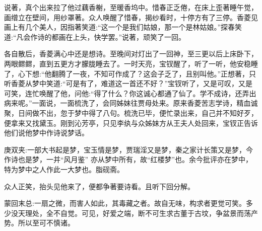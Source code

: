 \begin{parag}
    说著，真个出来拉了他过藕香榭，至暖香坞中。惜春正乏倦，在床上歪著睡午觉，画缯立在壁间，用纱罩著。众人唤醒了惜春，揭纱看时，十停方有了三停。香菱见画上有几个美人，因指著笑道:“这一个是我们姑娘，那一个是林姑娘。”探春笑道:“凡会作诗的都画在上头，快学罢。”说著，顽笑了一回。
\end{parag}


\begin{parag}
    各自散后，香菱满心中还是想诗。至晚间对灯出了一回神，至三更以后上床卧下，两眼鳏鳏，直到五更方才朦胧睡去了。一时天亮，宝钗醒了，听了一听，他安稳睡了，心下想:“他翻腾了一夜，不知可作成了？这会子乏了，且别叫他。”正想著，只听香菱从梦中笑道:“可是有了，难道这一首还不好？”宝钗听了，又是可叹，又是可笑，连忙唤醒了他，问他:“得了什么？你这诚心都通了仙了。学不成诗，还弄出病来呢。”一面说，一面梳洗了，会同姊妹往贾母处来。原来香菱苦志学诗，精血诚聚，日间做不出，忽于梦中得了八句。梳洗已毕，便忙录出来，自己并不知好歹，便拿来又找黛玉。刚到沁芳亭，只见李纨与众姊妹方从王夫人处回来，宝钗正告诉他们说他梦中作诗说梦话。\begin{note}庚双夹:一部大书起是梦，宝玉情是梦，贾瑞淫又是梦，秦之家计长策又是梦，今作诗也是梦，一并“风月鉴” 亦从梦中所有，故“红楼梦”也。余今批评亦在梦中，特为梦中之人作此一大梦也。脂砚斋。\end{note}众人正笑，抬头见他来了，便都争著要诗看。且听下回分解。
\end{parag}


\begin{parag}
    \begin{note}蒙回末总:一扇之微，而害人如此，其毒藏之者。故自无味，构求者更觉可笑。多少没天理处，全不自觉。可见，好爱之端，断不可生求古董于古坟，争盆景而荡产势。所以至可不慎诸。\end{note}
\end{parag}

